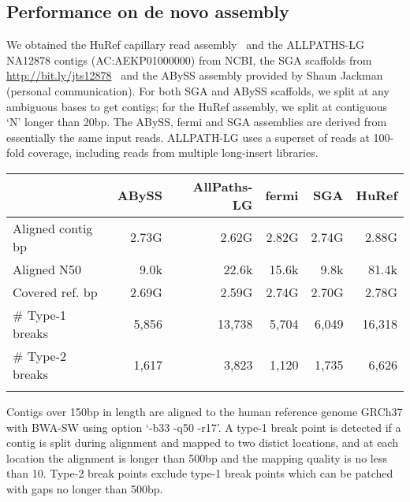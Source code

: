 \documentclass{bioinfo}
\begin{document}
\subsection{Performance on de novo assembly}
We obtained the HuRef capillary read assembly~\citep{Levy:2007uq} and the
ALLPATHS-LG NA12878 contigs (AC:AEKP01000000) from NCBI, the SGA scaffolds from
\mbox{\href{http://bit.ly/jts12878}{http://bit.ly/jts12878}}~\citep{Simpson:2011ly}
and the ABySS assembly provided by Shaun Jackman (personal communication).
For both SGA and ABySS scaffolds, we split at any ambiguous bases to get
contigs; for the HuRef assembly, we split at contiguous `N' longer than 20bp.
The ABySS, fermi and SGA assemblies are derived from essentially the same input
reads. ALLPATH-LG uses a superset of reads at 100-fold coverage, including
reads from multiple long-insert libraries.

\begin{table}[bt]
{\begin{tabular}{lrrrrr}
\toprule

                     & ABySS & AllPaths-LG & fermi & SGA & HuRef \\
\midrule
Aligned contig bp    & 2.73G & 2.62G & 2.82G & 2.74G & 2.88G \\
Aligned N50          & 9.0k  & 22.6k & 15.6k & 9.8k  & 81.4k \\
Covered ref. bp      & 2.69G & 2.59G & 2.74G & 2.70G & 2.78G \\
\# Type-1 breaks     & 5,856 &13,738 & 5,704 & 6,049 & 16,318 \\
\# Type-2 breaks     & 1,617 & 3,823 & 1,120 & 1,735 & 6,626 \\
\botrule
\end{tabular}}{Contigs over 150bp in length are aligned to the human reference
genome GRCh37 with BWA-SW using option `-b33 -q50 -r17'. A type-1 break point
is detected if a contig is split during alignment and mapped to two distict
locations, and at each location the alignment is longer than 500bp and the
mapping quality is no less than 10. Type-2 break points exclude type-1 break
points which can be patched with gaps no longer than 500bp.} \end{table}
\end{document}
